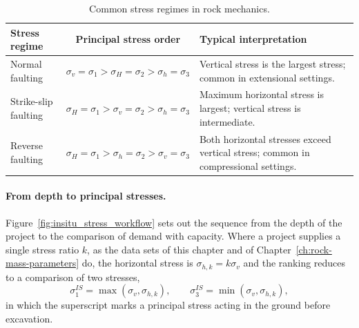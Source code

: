 \begin{table}[htbp]
\caption{Common stress regimes in rock mechanics.}
\label{tab:stress_regimes}
\centering
\small
\begin{tabularx}{\textwidth}{l c Y}
\toprule
\textbf{Stress regime} & \textbf{Principal stress order} & \textbf{Typical interpretation} \\
\midrule
Normal faulting &
\(\sigma_v = \sigma_1 > \sigma_H = \sigma_2 > \sigma_h = \sigma_3\) &
Vertical stress is the largest stress; common in extensional settings. \\
Strike-slip faulting &
\(\sigma_H = \sigma_1 > \sigma_v = \sigma_2 > \sigma_h = \sigma_3\) &
Maximum horizontal stress is largest; vertical stress is intermediate. \\
Reverse faulting &
\(\sigma_H = \sigma_1 > \sigma_h = \sigma_2 > \sigma_v = \sigma_3\) &
Both horizontal stresses exceed vertical stress; common in compressional settings. \\
\bottomrule
\end{tabularx}
\end{table}

\paragraph{From depth to principal stresses.}
Figure~\ref{fig:insitu_stress_workflow} sets out the sequence from the depth
of the project to the comparison of demand with capacity. Where a project
supplies a single stress ratio \(k\), as the data sets of this chapter and of
Chapter~\ref{ch:rock-mass-parameters} do, the horizontal stress is
\(\sigma_{h,k} = k\sigma_v\) and the ranking reduces to a comparison of two
stresses,
\[
\sigma_1^{IS} = \max(\sigma_v,\sigma_{h,k}) ,
\qquad
\sigma_3^{IS} = \min(\sigma_v,\sigma_{h,k}) ,
\]
in which the superscript marks a principal stress acting in the ground before
excavation.

